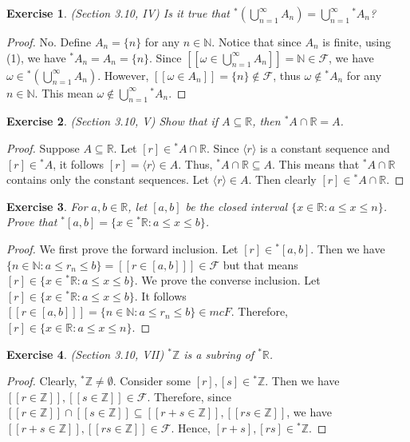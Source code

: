 \documentclass[a4paper, 11pt]{book}
\theoremstyle{plain}
\newtheorem{exercise}{Exercise}[chapter]
\theoremstyle{plain}
\newcommand{\mc}{\mathcal}
\newcommand{\N}{\mathbb{N}}
\newcommand{\Z}{\mathbb{Z}}
\newcommand{\R}{\mathbb{R}}
\newcommand{\la}{\langle}
\newcommand{\ra}{\rangle}
\newcommand{\hyp}{{}^*}
\begin{document}
  \begin{exercise}
    (Section 3.10, IV)
    Is it true that $\hyp (\bigcup_{n=1}^\infty A_n)=\bigcup_{n=1}^\infty \hyp A_n$?
  \end{exercise}
  \begin{proof}
    No. Define $A_n=\{n\}$ for any $n \in \N$. Notice that since $A_n$ is finite, using (1), we have $\hyp A_n=A_n=\{n\}$. Since $[[\omega \in \bigcup_{n=1}^\infty A_n]]=\N \in \mc{F}$, we have $\omega \in \hyp (\bigcup_{n=1}^\infty A_n)$. However, $[[\omega \in A_n]]=\{n\} \notin \mc{F}$, thus $\omega \notin \hyp A_n$ for any $n \in \N$. This mean $\omega \notin \bigcup_{n=1}^\infty \hyp A_n$.
  \end{proof}

  \begin{exercise}
    (Section 3.10, V)
    Show that if $A \subseteq \R$, then $\hyp A \cap \R =A$.
  \end{exercise}
  \begin{proof}
    Suppose $A \subseteq \R$. Let $[r] \in \hyp A \cap \R$. Since $\la r \ra$ is a constant sequence and $[r] \in \hyp A$, it follows $[r]=\la r \ra \in A$. Thus, $\hyp A \cap \R \subseteq A$. This means that $\hyp A \cap \R$ contains only the constant sequences. Let $\la r \ra \in A$. Then clearly $[r] \in \hyp A \cap \R$.
  \end{proof}

  \begin{exercise}
    For $a,b \in \R$, let $[a,b]$ be the closed interval $\{x \in \R: a \leq x \leq n\}$. Prove that $\hyp [a,b]=\{x \in \hyp \R: a \leq x \leq b\}$.
  \end{exercise}
  \begin{proof}
    We first prove the forward inclusion. Let $[r] \in \hyp [a,b]$. Then we have $\{n \in \N: a \leq r_n \leq b\}=[[r \in [a,b]]] \in \mc{F}$ but that means $[r] \in \{x \in \hyp \R: a \leq x \leq b\}$. We prove the converse inclusion. Let $[r] \in \{x \in \hyp \R: a \leq x \leq b\}$. It follows $[[r \in [a,b]]]=\{n \in \N: a \leq r_n \leq b\} \in mc{F}$. Therefore, $[r] \in \{x \in \R: a \leq x \leq n\}$.
  \end{proof}

  \begin{exercise}
    (Section 3.10, VII) 
    $\hyp \Z$ is a subring of $\hyp \R$.
  \end{exercise}
  \begin{proof}
    Clearly, $\hyp \Z \not = \emptyset$. Consider some $[r], [s] \in \hyp \Z$. Then we have $[[r \in \Z]], [[s \in \Z]] \in \mc{F}$. Therefore, since $[[r \in \Z]] \cap [[s \in \Z]] \subseteq [[r+s \in \Z]], [[rs \in \Z]]$, we have $[[r+s \in \Z]], [[rs \in \Z]] \in \mc{F}$. Hence, $[r+s], [rs] \in \hyp \Z$.
  \end{proof}
\end{document}
